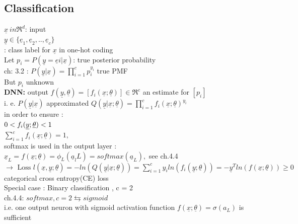 \subsection{Classification}
$ \underline{x} \ in \Re^d  $: input \\
$ \underline{y} \in \lbrace \underline{e}_1 , \underline{e}_2,..,\underline{e}_c \rbrace $ \\: class label for $ \underline{x} $ in one-hot coding \\
Let $ p_i = P(\underline{y} = \underline{e}i | \underline{x} )  $: true posterior probability \\
ch: 3.2 : $ P(\underline{y} | \underline{x}) = \prod_{i=1}^{c}  p_i ^{y_i}$ true PMF \\
But $ p_i $ unknown \\
\textbf{DNN: }
\textbullet output $ f(\underline{y} ,\underline{\theta}) = [f_i (\underline{x}; \underline{\theta})] \in \Re^c $ an estimate for $  [p_i]  $ \\
\textbullet i. e. $ P(\underline{y} | \underline{x}) $ approximated $ Q (\underline{y} | \underline{x} ; \underline{\theta})  = \prod_{ i=1 }^{c} f_i ( \underline{x} ; \underline{\theta})^{y_i}$\\
in order to ensure : \\
\textbullet $  0 < f_i (\underline{y} ; \underline{\theta}) < 1 \\ $\\
\textbullet $  \sum_{i=1}^{c} f_i (\underline{x} ; \underline{\theta})  = 1,$ \\
softmax is used in the output layer : \\
$  \underline{x} _{L} = f (\underline{x} ; \underline{\theta}) = \phi_L (\underline{a}_lL) = softmax (\underline{a}_L) , $ see ch.4.4\\
$  \rightarrow \text{ Loss } l(\underline{x} , \underline{y} ; \underline{\theta}) = - ln(Q(\underline{y} | \underline{x} ; \underline{\theta })) = \sum_{i=1  }^{c} y_i ln (f_i (\underline{y} ; \underline{\theta}))   = - \underline{y} ^T ln (f(\underline{x} ; \underline{ \theta })) \geq 0 $\\
categorical cross entropy(CE) loss \\
Special case : Binary classification , c = 2 \\
ch.4.4: $ softmax , c = 2 \leftrightarrows sigmoid $ \\
i.e. one output neuron with sigmoid activation function $ f(\underline{x}; \underline{ \theta})  = \sigma (a_L)$ is sufficient\\
